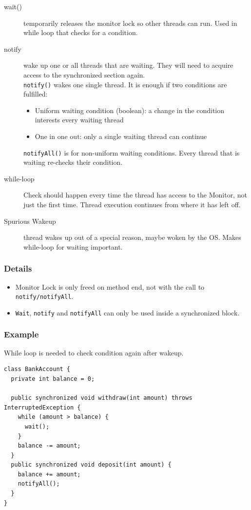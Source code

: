 \begin{description}
  \item[wait()] temporarily releases the monitor lock so other threads can run. Used in while loop that checks for a condition.
  \item[notify] wake up one or all threads that are waiting. They will need to acquire access to the synchronized section again. \\
  \texttt{notify()} wakes one single thread. It is enough if two conditions are fulfilled:
  \begin{itemize}
    \item Uniform waiting condition (boolean): a change in the condition interests every waiting thread 
    \item One in one out: only a single waiting thread can continue
  \end{itemize}
  \texttt{notifyAll()} is for non-uniform waiting conditions. Every thread that is waiting re-checks their condition.
  \item[while-loop] Check should happen every time the thread has access to the Monitor, not just the first time. Thread execution continues from where it has left off.
  \item[Spurious Wakeup] thread wakes up out of a special reason, maybe woken by the OS. Makes while-loop for waiting important.
\end{description}

\subsubsection*{Details}
\begin{itemize}
  \item Monitor Lock is only freed on method end, not with the call to \texttt{notify/notifyAll}.
  \item \texttt{Wait}, \texttt{notify} and \texttt{notifyAll} can only be used inside a synchronized block.
\end{itemize}

\subsubsection*{Example} 
While loop is needed to check condition again after wakeup. 
\begin{verbatim}
class BankAccount {
  private int balance = 0;

  public synchronized void withdraw(int amount) throws InterruptedException {
    while (amount > balance) {
      wait();
    }
    balance -= amount;
  }
  public synchronized void deposit(int amount) {
    balance += amount;
    notifyAll();
  }
}
\end{verbatim}


